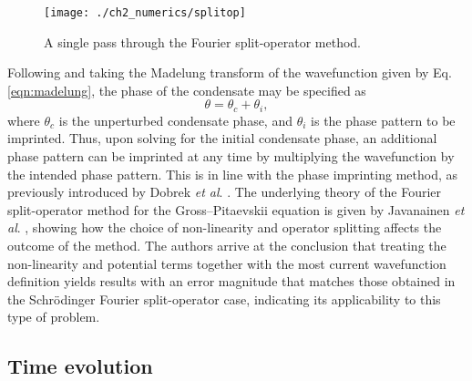 \begin{figure}
    \centering
    \texttt{[image: ./ch2\_numerics/splitop]}
    \caption{A single pass through the Fourier split-operator method.}
    \label{fig:num_splitop}
\end{figure}

Following \cite{BK:Pitaevskii_Stringari_2003} and taking the Madelung transform of the wavefunction given by Eq. \eqref{eqn:madelung}, the phase of the condensate may be specified as
\begin{equation}
\theta = \theta_c + \theta_i,
\end{equation}
where $\theta_c$ is the unperturbed condensate phase, and $\theta_i$ is the phase pattern to be imprinted. Thus, upon solving for the initial condensate phase, an additional phase pattern can be imprinted at any time by multiplying the wavefunction by the intended phase pattern. This is in line with the phase imprinting method, as previously introduced by Dobrek \textit{et al}. \cite{Vtx:Dobrek_pra_1999}. The underlying theory of the Fourier split-operator method for the Gross--Pitaevskii equation is given by Javanainen \textit{et al}. \cite{BEC:Javanainen_jphysa_2006}, showing how the choice of non-linearity and operator splitting affects the outcome of the method. The authors arrive at the conclusion that treating the non-linearity and potential terms together with the most current wavefunction definition yields results with an error magnitude that matches those obtained in the Schr\"{o}dinger Fourier split-operator case, indicating its applicability to this type of problem.

 \subsection{Time evolution}

